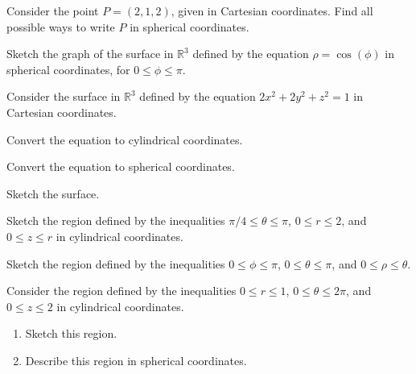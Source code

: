 \documentclass{ximera}
\begin{document}
\begin{problem}
Consider the point $P = (2, 1, 2)$, given in Cartesian coordinates. Find all possible ways to write $P$ in spherical coordinates.
\end{problem}

\begin{problem}
Sketch the graph of the surface in $\mathbb{R}^3$ defined by the equation $\rho = \cos(\phi)$ in spherical coordinates, for $0\leq \phi\leq \pi$.
\end{problem}

\begin{problem}
Consider the surface in $\mathbb{R}^3$ defined by the equation $2x^2+2y^2+z^2=1$ in Cartesian coordinates.
\item Convert the equation to cylindrical coordinates.
\item Convert the equation to spherical coordinates.
\item Sketch the surface.
\end{problem}

\begin{problem}
Sketch the region defined by the inequalities $\pi/4\leq \theta\leq \pi$, $0\leq r\leq 2$, and $0\leq z\leq r$ in cylindrical coordinates.
\end{problem}

\begin{problem}
Sketch the region defined by the inequalities $0\leq \phi\leq \pi$, $0\leq \theta\leq \pi$, and $0\leq \rho\leq \theta$.
\end{problem}

\begin{problem}
Consider the region defined by the inequalities $0\leq r\leq 1$, $0\leq \theta \leq 2\pi$, and $0\leq z\leq 2$ in cylindrical coordinates.
\begin{enumerate}
\item Sketch this region.
\item Describe this region in spherical coordinates.
\end{enumerate} 
\end{problem}
\end{document}
